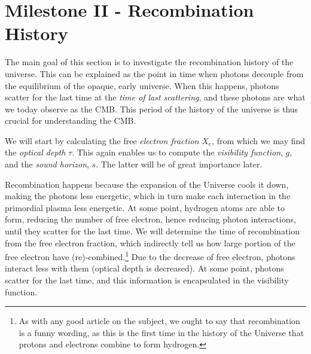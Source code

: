 \section{Milestone II - Recombination History}\label{sec:m2}

The main goal of this section is to investigate the recombination history of the universe. This can be explained as the point in time when photons decouple from the equilibrium of the opaque, early universe.  When this happens, photons scatter for the last time at the \textit{time of last scattering}, and these photons are what we today observe as the CMB. This period of the history of the universe is thus crucial for understanding the CMB. 

We will start by calculating the free \textit{electron fraction} $X_e$, from which we may find the \textit{optical depth} $\tau$. This again enables us to compute the \textit{visibility function}, $g$, and the \textit{sound horizon}, $s$. The latter will be of great importance later. 

Recombination happens because the expansion of the Universe cools it down, making the photons less energetic, which in turn make each interaction in the primordial plasma less energetic. At some point, hydrogen atoms are able to form, reducing the number of free electron, hence reducing photon interactions, until they scatter for the last time. We will determine the time of recombination from the free electron fraction, which indirectly tell us how large portion of the free electron have (re)-combined.\footnote{As with any good article on the subject, we ought to say that recombination is a funny wording, as this is the first time in the history of the Universe that protons and electrons combine to form hydrogen.} Due to the decrease of free electron, photons interact less with them (optical depth is decreased). At some point, photons scatter for the last time, and this information is encapsulated in the visibility function. 






